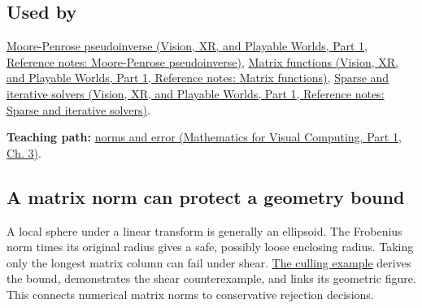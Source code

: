 \subsection{Used by}\label{appendix-f8657bac66e5-used-by}

\hypertarget{appendix-f8657bac66e5-used-by}{}

\href{../07-Vision-XR-and-Playable-Worlds-P01/main.pdf\#nameddest=appendix-541306fdbc1b}{Moore-Penrose pseudoinverse (Vision, XR, and Playable Worlds, Part 1, Reference notes: Moore-Penrose pseudoinverse)}, \href{../07-Vision-XR-and-Playable-Worlds-P01/main.pdf\#nameddest=appendix-0f4bc2bf2b1f}{Matrix functions (Vision, XR, and Playable Worlds, Part 1, Reference notes: Matrix functions)}, \href{../07-Vision-XR-and-Playable-Worlds-P01/main.pdf\#nameddest=appendix-67c87a3d9e94}{Sparse and iterative solvers (Vision, XR, and Playable Worlds, Part 1, Reference notes: Sparse and iterative solvers)}.

\textbf{Teaching path:} \href{../02-Mathematics-for-Visual-Computing-P01/main.pdf\#nameddest=01-foundations-i-ch019-matrix-norms-give-scale-to-residuals-and-error-claims}{norms and error (Mathematics for Visual Computing, Part 1, Ch. 3)}.

\subsection{A matrix norm can protect a geometry bound}\label{appendix-f8657bac66e5-a-matrix-norm-can-protect-a-geometry-bound}

\hypertarget{appendix-f8657bac66e5-a-matrix-norm-can-protect-a-geometry-bound}{}

A local sphere under a linear transform is generally an ellipsoid. The Frobenius norm times its original radius gives a safe, possibly loose enclosing radius. Taking only the longest matrix column can fail under shear. \hyperref[04-visual-computing-ii-ch028-a-line-corridor-can-be-a-cheap-prefilter-for-shadow-caster-work]{The culling example} derives the bound, demonstrates the shear counterexample, and links its geometric figure. This connects numerical matrix norms to conservative rejection decisions.
